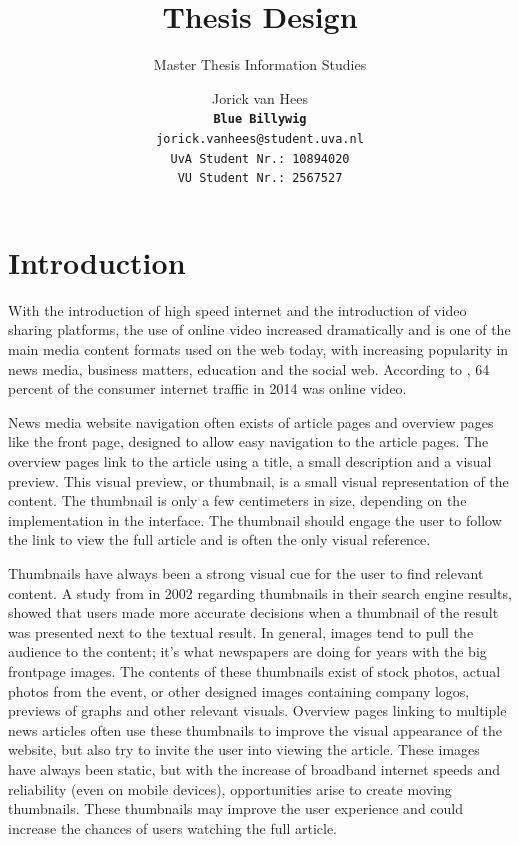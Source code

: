 \documentclass{../resources/acm_proc_article-sp}
\begin{document}
\title{Thesis Design}
\subtitle{Master Thesis Information Studies}

\author{
Jorick van Hees \\
\texttt{\textbf{Blue Billywig}} \\
\texttt{jorick.vanhees@student.uva.nl} \\
\texttt{UvA Student Nr.: 10894020} \\
\texttt{VU Student Nr.: 2567527}
}

\maketitle


\section{Introduction}

With the introduction of high speed internet and the introduction of video sharing platforms, the use of online video increased dramatically and is one of the main media content formats used on the web today, with increasing popularity in news media, business matters, education and the social web. According to \textcite{Cisco:2015wm}, 64 percent of the consumer internet traffic in 2014 was online video.

News media website navigation often exists of article pages and overview pages like the front page, designed to allow easy navigation to the article pages. The overview pages link to the article using a title, a small description and a visual preview. This visual preview, or thumbnail, is a small visual representation of the content. The thumbnail is only a few centimeters in size, depending on the implementation in the interface. The thumbnail should engage the user to follow the link to view the full article and is often the only visual reference.

Thumbnails have always been a strong visual cue for the user to find relevant content. A study from \textcite{Dziadosz:2002cl} in 2002 regarding thumbnails in their search engine results, showed that users made more accurate decisions when a thumbnail of the result was presented next to the textual result. In general, images tend to pull the audience to the content; it's what newspapers are doing for years with the big frontpage images. The contents of these thumbnails exist of stock photos, actual photos from the event, or other designed images containing company logos, previews of graphs and other relevant visuals. Overview pages linking to multiple news articles often use these thumbnails to improve the visual appearance of the website, but also try to invite the user into viewing the article. These images have always been static, but with the increase of broadband internet speeds and reliability (even on mobile devices), opportunities arise to create moving thumbnails. These thumbnails may improve the user experience and could increase the chances of users watching the full article.
\end{document}
